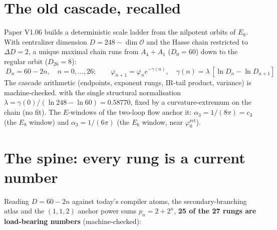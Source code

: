 \documentclass[11pt,a4paper]{article}
\newcommand{\cthree}{c_3}
\newcommand{\phiz}{\varphi_0^{\mathrm{ret}}}
\theoremstyle{definition}
\begin{document}
\section{The old cascade, recalled}
Paper V1.06 builds a deterministic scale ladder from the nilpotent orbits of $E_8$. With centralizer
dimension $D=248-\dim\mathcal O$ and the Hasse chain restricted to $\Delta D=2$, a unique maximal chain
runs from $A_4{+}A_1$ ($D_0=60$) down to the regular orbit ($D_{26}=8$):
\[
  \boxed{\ D_n=60-2n,\quad n=0,\dots,26;\qquad \varphi_{n+1}=\varphi_n e^{-\gamma(n)},\quad
  \gamma(n)=\lambda\,[\ln D_n-\ln D_{n+1}]\ }
\]
\noindent The cascade arithmetic (endpoints, exponent rungs, IR-tail product, variance) is
machine-checked.
with the single structural normalisation $\lambda=\gamma(0)/(\ln248-\ln60)=0.58770$, fixed by a
curvature-extremum on the chain (no fit). The $E$-windows of the two-loop flow anchor it: $\alpha_3=1/(8\pi)=\cthree$
(the $E_8$ window) and $\alpha_3=1/(6\pi)$ (the $E_6$ window, near $\phiz$).

\section{The spine: every rung is a current number}
Reading $D=60-2n$ against today's compiler atoms, the secondary-branching atlas and the $(1,1,2)$ anchor
power sums $p_n=2+2^n$, \textbf{25 of the 27 rungs are load-bearing numbers} (machine-checked):
\end{document}
